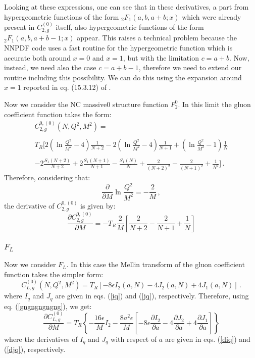 \documentclass[10pt,a4paper]{article}
\begin{document}
Looking at these expressions, one can see that in these derivatives, a part from hypergeometric functions of the form ${_2F_1(a,b,a+b;x)}$ which were already present in $C_{2,g}^{(0)}$ itself, also hypergeometric functions of the form ${_2F_1(a,b,a+b-1;x)}$ appear. This raises a technical problem because the NNPDF code uses a fast routine for the hypergeometric function which is accurate both around $x=0$ and $x=1$, but with the limitation $c=a+b$. Now, instead, we need also the case ${c=a+b-1}$, therefore we need to extend our routine including this possibility. We can do this using the expansion around $x=1$ reported in eq. (15.3.12) of \cite{AbramowitzStegun}.

Now we consider the NC massive0 structure function $F_2^0$. In this limit the gluon coefficient function takes the form:
\begin{equation}
\begin{array}{c}
\displaystyle C_{2,g}^{0,(0)}(N,Q^2,M^2)=\\
\\
\displaystyle T_R\Bigg[2\left(\ln\frac{Q^2}{M^2}-4\right)\frac1{N+2}-2\left(\ln\frac{Q^2}{M^2}-4\right)\frac1{N+1}+\left(\ln\frac{Q^2}{M^2}-1\right)\frac1N\\
\\
\displaystyle -2\frac{S_1(N+2)}{N+2}+2\frac{S_1(N+1)}{N+1}-\frac{S_1(N)}{N}+\frac2{(N+2)^2}-\frac2{(N+1)^2}+\frac1{N^2}\Bigg]\,.
\end{array}
\end{equation}
Therefore, considering that:
\begin{equation}
\frac{\partial}{\partial M} \ln\frac{Q^2}{M^2} = - \frac2M\,,
\end{equation}
the derivative of $C_{2,g}^{0,(0)}$ is given by:
\begin{equation}
\frac{\partial C_{2,g}^{0,(0)}}{\partial M}= -T_R\frac{2}{M}\left[\frac2{N+2}-\frac2{N+1}+\frac1N\right]
\end{equation}

\subsubsection{$F_L$}

Now we consider $F_L$. In this case the Mellin transform of the gluon coefficient function takes the simpler form:
\begin{equation}
C_{L,g}^{(0)}\left(N,Q^2,M^2\right)= T_R\left[-8\epsilon
  I_2(a,N)-4J_2(a,N)+4J_1(a,N)\right]\,.
\label{cgnf1L}
\end{equation}
where $I_q$ and $J_q$ are given in eqs. (\ref{iq}) and (\ref{jq}), respectively. Therefore, using eq. (\ref{gngngngngng}), we get:
\begin{equation}
\frac{\partial C_{L,g}^{(0)}}{\partial M}= T_R\left\{-\frac{16\epsilon}{M} I_2 -\frac{8a^2\epsilon}{M}\left[-8\epsilon \frac{\partial I_2}{\partial a}-4\frac{\partial J_2}{\partial a}+4\frac{\partial J_1}{\partial a}\right]\right\}
\end{equation}
where the derivatives of $I_q$ and $J_q$ with respect of $a$ are given in eqs. (\ref{diq}) and (\ref{djq}), respectively.
\end{document}

